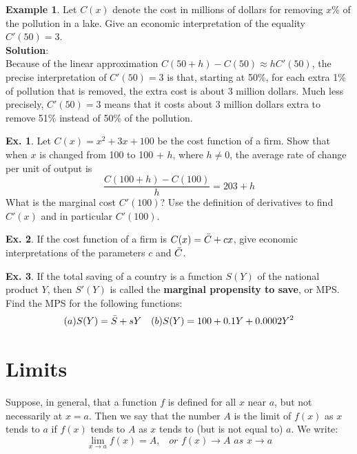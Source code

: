 \documentclass[10pt,a4paper]{book}
\theoremstyle{definition}\newtheorem{definition}{Definition}
\theoremstyle{definition}\newtheorem{fact}{Fact}
\theoremstyle{definition}\newtheorem{ex}{Ex.}
\theoremstyle{definition}\newtheorem{project}{Project}
\theoremstyle{definition}\newtheorem{problem}{Problem}
\theoremstyle{definition}\newtheorem{example}{Example}
\numberwithin{theorem}{chapter}
\numberwithin{corollary}{chapter}
\numberwithin{assumption}{chapter}
\numberwithin{definition}{chapter}
\numberwithin{prop}{chapter}
\numberwithin{notation}{chapter}
\numberwithin{problem}{chapter}
\numberwithin{example}{chapter}
\numberwithin{fact}{chapter}
\numberwithin{ex}{chapter}
\begin{document}
	\begin{example}
		Let $C(x)$ denote the cost in millions of dollars for removing $x$\% of the pollution in a lake. Give an economic interpretation of the equality $C'(50) = 3$.
		\\
		\textbf{Solution}:
		\\
		Because of the linear approximation $C(50 + h) - C(50) \approx h C'(50)$, the precise interpretation of $C'(50) = 3$ is that, starting at 50\%, for each extra 1\% of pollution that is removed, the extra cost is about 3 million dollars. Much less precisely, $C'(50) = 3$ means that it costs about 3 million dollars extra to remove 51\% instead of 50\% of the pollution.
	\end{example}
	
	\begin{ex}
		Let $C(x) = x^2 + 3x + 100$ be the cost function of a firm. Show that when $x$ is changed from 100 to 100 + $h$, where $h \neq 0$, the average rate of change per unit of output is
		$$\frac{C(100+h)-C(100)}{h} = 203+h$$
		What is the marginal cost $C'(100)$? Use the definition of derivatives to find $C'(x)$ and in particular $C'(100)$.
	\end{ex}
	
	\begin{ex}
		If the cost function of a firm is $C(x) = \Bar{C} + cx$, give economic interpretations of the parameters $c$ and $\Bar{C}$.
	\end{ex}
	
	\begin{ex}
		If the total saving of a country is a function $S(Y)$ of the national product $Y$, then $S'(Y)$ is called the \textbf{marginal propensity to save}, or MPS. Find the MPS for the following functions:
		\begin{align*}
			& (a) S(Y)= \Bar{S} + sY      
			& (b) S(Y)=100+0.1Y+0.0002Y^2 
		\end{align*}
	\end{ex}
	
	\section{Limits}
	
	Suppose, in general, that a function $f$ is defined for all $x$ near $a$, but not necessarily at $x = a$. Then we say that the number $A$ is the limit of $f (x)$ as $x$ tends to $a$ if $f (x)$ tends to $A$ as $x$ tends to (but is not equal to) $a$. We write:
	$$\lim_{x \rightarrow a} f(x)=A, \,\,\,\,\,or \,\,f(x)\rightarrow A \,\,as\,\,x \rightarrow a$$
	
\end{document}
